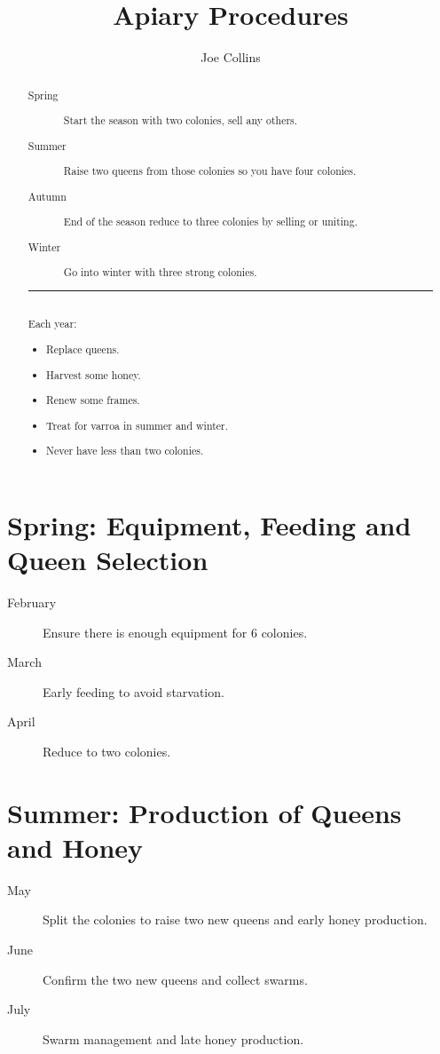 \documentclass{./BeekeepingBook}
\title{Apiary Procedures \the\year{}}
\author{Joe Collins}
\date{}
\begin{document}
\maketitle
\thispagestyle{empty}

\begin{abstract}

  \begin{description}
    \item[Spring] Start the season with two colonies, sell any others.
    \item[Summer] Raise two queens from those colonies so you have four colonies.
    \item[Autumn] End of the season reduce to three colonies by selling or uniting.
    \item[Winter] Go into winter with three strong colonies. 
  \end{description}

  \vfill
  \rule{8cm}{0.4pt}\\
  Each year:
  \begin{itemize}
    \item Replace queens.
    \item Harvest some honey. 
    \item Renew some frames.
    \item Treat for varroa in summer and winter.
    \item Never have less than two colonies.
  \end{itemize}

\end{abstract}

\clearpage
\tableofcontents
\thispagestyle{empty}

\clearpage
\section{Spring: Equipment, Feeding and Queen Selection}
\begin{description}
  \item[February] Ensure there is enough equipment for 6 colonies.
  \item[March] Early feeding to avoid starvation.
  \item[April] Reduce to two colonies.
\end{description}
\clearpage

\clearpage

\clearpage


\clearpage
\section{Summer: Production of Queens and Honey}
\begin{description}
  \item[May] Split the colonies to raise two new queens and early honey production.
  \item[June] Confirm the two new queens and collect swarms.
  \item[July] Swarm management and late honey production.
\end{description}
\clearpage

\clearpage

\clearpage

\end{document}
